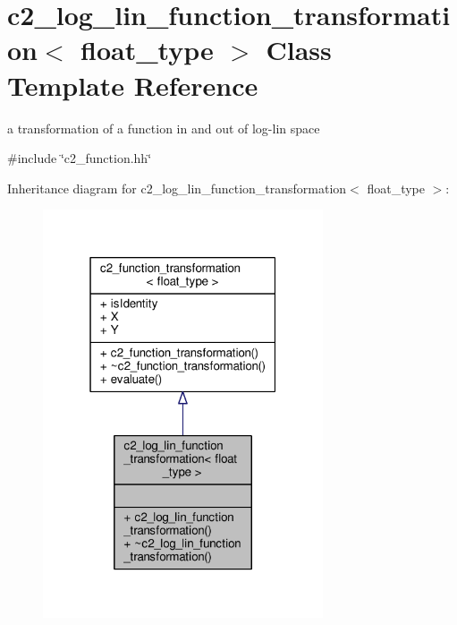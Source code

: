 \hypertarget{classc2__log__lin__function__transformation}{}\section{c2\+\_\+log\+\_\+lin\+\_\+function\+\_\+transformation$<$ float\+\_\+type $>$ Class Template Reference}
\label{classc2__log__lin__function__transformation}


a transformation of a function in and out of log-\/lin space  




{\ttfamily \#include \char`\"{}c2\+\_\+function.\+hh\char`\"{}}



Inheritance diagram for c2\+\_\+log\+\_\+lin\+\_\+function\+\_\+transformation$<$ float\+\_\+type $>$\+:
\nopagebreak
\begin{figure}[H]
\begin{center}
\leavevmode
\includegraphics[width=235pt]{classc2__log__lin__function__transformation__inherit__graph}
\end{center}
\end{figure}


